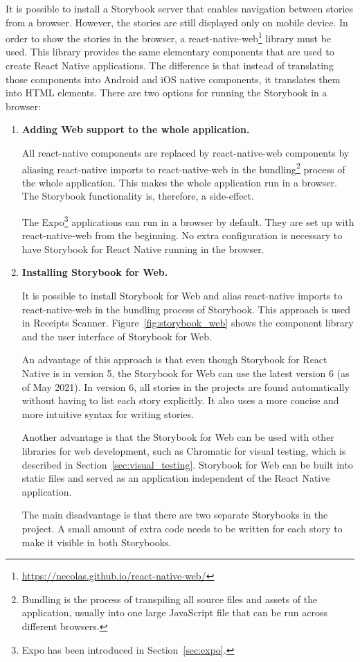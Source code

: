 \documentclass[
  digital, %
  table,   %
  oneside, %
  lof,     %
  lot,     %
]{fithesis3}
\begin{document}
It is possible to install a Storybook server that enables navigation between stories from a browser. However, the stories are still displayed only on mobile device. In order to show the stories in the browser, a react-native-web\footnote{\url{https://necolas.github.io/react-native-web/}} library must be used. This library provides the same elementary components that are used to create React Native applications. The difference is that instead of translating those components into Android and iOS native components, it translates them into HTML elements.
There are two options for running the Storybook in a browser:

\begin{enumerate}
    \item \textbf{Adding Web support to the whole application.}
    
    All react-native components are replaced by react-native-web components by aliasing react-native imports to react-native-web in the bundling\footnote{Bundling is the process of transpiling all source files and assets of the application, usually into one large JavaScript file that can be run across different browsers.} process of the whole application. This makes the whole application run in a browser. The Storybook functionality is, therefore, a side-effect.
    
    The Expo\footnote{Expo has been introduced in Section~\ref{sec:expo}.} applications can run in a browser by default. They are set up with react-native-web from the beginning. No extra configuration is necessary to have Storybook for React Native running in the browser.
    
    \item \textbf{Installing Storybook for Web.} 
    
    It is possible to install Storybook for Web and alias react-native imports to react-native-web in the bundling process of Storybook. This approach is used in Receipts Scanner. Figure~\ref{fig:storybook_web} shows the component library and the user interface of Storybook for Web.
    
    An advantage of this approach is that even though Storybook for React Native is in version 5, the Storybook for Web can use the latest version 6 (as of May 2021). In version 6, all stories in the projects are found automatically without having to list each story explicitly. It also uses a more concise and more intuitive syntax for writing stories.
    
    Another advantage is that the Storybook for Web can be used with other libraries for web development, such as Chromatic for visual testing, which is described in Section~\ref{sec:visual_testing}. Storybook for Web can be built into static files and served as an application independent of the React Native application.
    
    The main disadvantage is that there are two separate Storybooks in the project. A small amount of extra code needs to be written for each story to make it visible in both Storybooks. 
    
\end{enumerate}
\end{document}
